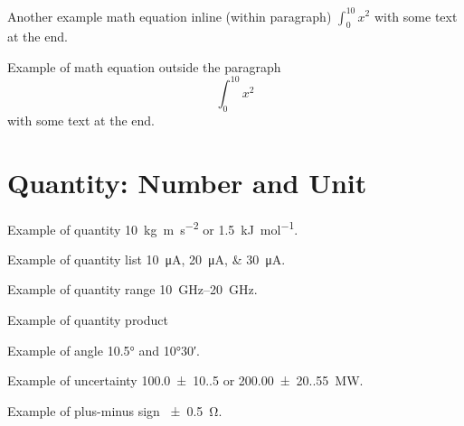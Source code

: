 Another example math equation inline (within paragraph) \( \int_{0}^{10} x^2 \) with some text at the end.

Example of math equation outside the paragraph \[ \int_{0}^{10} x^2 \] with some text at the end.

\section{Quantity: Number and Unit}

Example of quantity \qty{10}{\kg\m\per\s\squared} or \qty[per-mode=symbol]{1.5}{\kJ\per\mol}.

Example of quantity list \qtylist{10;20;30}{\uA}.

Example of quantity range \qtyrange{10}{20}{\GHz}.

Example of quantity product 

Example of angle \ang{10.5} and \ang{10;30}.

Example of uncertainty \qty{100.0(10.5)}{\nF} or \qty[separate-uncertainty-units = repeat]{200.00(20.55)}{\MW}.

Example of plus-minus sign \qty{\pm 0.5}{\ohm}.

